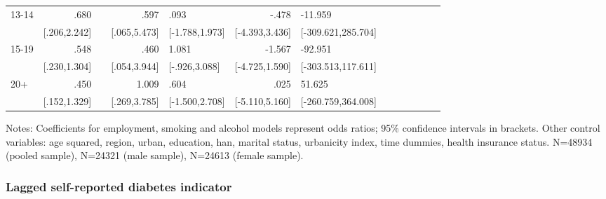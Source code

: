 \begin{table}[h]
\begin{adjustbox}{max width=\linewidth}
\begin{threeparttable}
{\begin{tabular}{l*{6}{D{.}{.}{-1}l}}
13-14           &            .680&                &            .597&            .093&           -.478&         -11.959\\
                &    [.206,2.242]&                &    [.065,5.473]&  [-1.788,1.973]&  [-4.393,3.436]&[-309.621,285.704]\\

15-19           &            .548&                &            .460&           1.081&          -1.567&         -92.951\\
                &    [.230,1.304]&                &    [.054,3.944]&   [-.926,3.088]&  [-4.725,1.590]&[-303.513,117.611]\\

20+             &            .450&                &           1.009&            .604&            .025&          51.625\\
                &    [.152,1.329]&                &    [.269,3.785]&  [-1.500,2.708]&  [-5.110,5.160]&[-260.759,364.008]\\
\bottomrule
\end{tabular}
\begin{tablenotes}
\item Notes: Coefficients for employment, smoking and alcohol models represent odds ratios;  95\% confidence intervals in brackets.
Other control variables: age squared, region, urban, education, han, marital status, urbanicity index, time dummies, health insurance status. N=48934 (pooled sample), N=24321 (male sample), N=24613 (female sample).
\end{tablenotes}
}
\end{threeparttable}
\end{adjustbox}
\end{table}


\FloatBarrier


\subsubsection*{Lagged self-reported diabetes indicator}

